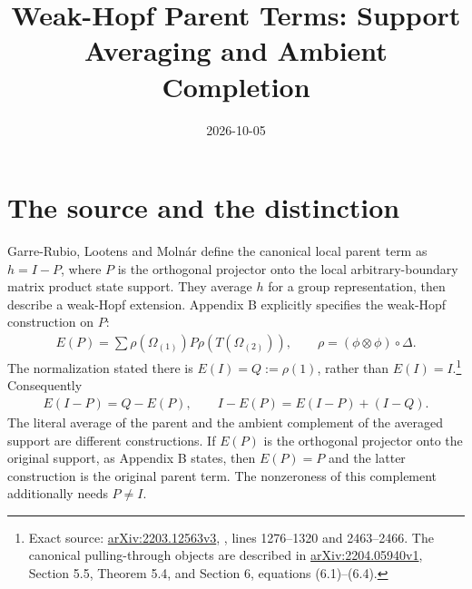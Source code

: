 \documentclass{article}
\title{Weak-Hopf Parent Terms: Support Averaging and Ambient Completion}
\author{}
\date{2026-10-05}
\begin{document}
\maketitle
{}

\section{The source and the distinction}
Garre-Rubio, Lootens and Moln\'ar define the canonical local parent term
as $h=I-P$, where $P$ is the orthogonal projector onto the local
arbitrary-boundary matrix product state support. They average $h$ for a
group representation, then describe a weak-Hopf extension. Appendix B
explicitly specifies the weak-Hopf construction on $P$:
\begin{align}
    E(P)=\sum\rho(\Omega_{(1)})P\rho(T(\Omega_{(2)})),
    \qquad \rho=(\phi\otimes\phi)\circ\Delta.
    \label{eq:glm23_wha_parent_average}
\end{align}
The normalization stated there is $E(I)=Q:=\rho(1)$, rather than
$E(I)=I$.\footnote{Exact source:
    \href{https://arxiv.org/abs/2203.12563v3}{arXiv:2203.12563v3},
    , lines 1276--1320 and 2463--2466.
    The canonical pulling-through objects are described in
    \href{https://arxiv.org/abs/2204.05940v1}{arXiv:2204.05940v1},
    Section 5.5, Theorem 5.4, and Section 6, equations (6.1)--(6.4).}
Consequently
\begin{align}
    E(I-P)=Q-E(P),\qquad I-E(P)=E(I-P)+(I-Q).
    \label{eq:glm23_wha_parent_complement}
\end{align}
The literal average of the parent and the ambient complement of the
averaged support are different constructions. If $E(P)$ is the
orthogonal projector onto the original support, as Appendix B states,
then $E(P)=P$ and the latter construction is the original parent term.
The nonzeroness of this complement additionally needs $P\ne I$.
\end{document}
